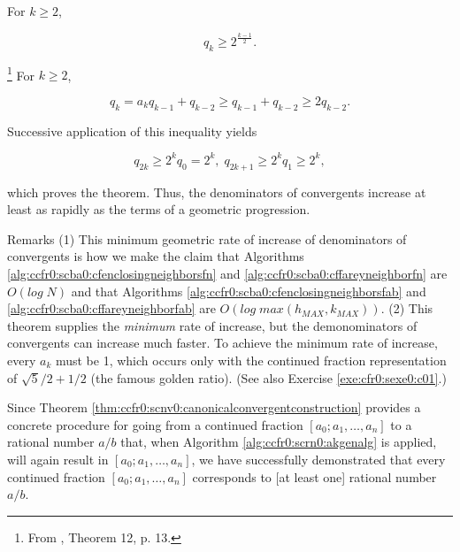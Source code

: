 \begin{vworktheoremstatement}
\label{thm:ccfr0:scnv0:minimumrateofconvergentdenominatorincrease}
For $k \geq 2$,

\begin{equation}
q_k \geq 2^{\frac{k-1}{2}} .
\end{equation}
\end{vworktheoremstatement}
\begin{vworktheoremproof}\hspace{-0.4em}\footnote{From
\cite{bibref:b:KhinchinClassic}, Theorem 12, p. 13.}
For $k \geq 2$,

\begin{equation}
q_k = a_k q_{k-1} + q_{k-2} \geq q_{k-1} + q_{k-2} \geq 2 q_{k-2} .
\end{equation}

Successive application of this inequality yields

\begin{equation}
q_{2k} \geq 2^k q_0 = 2^k, \; q_{2k+1} \geq 2^k q_1 \geq 2^k ,
\end{equation}

which proves the theorem.  Thus, the denominators of convergents
increase at least as rapidly as the terms of a geometric
progression.
\end{vworktheoremproof}
\begin{vworktheoremparsection}{Remarks}
(1) This minimum geometric rate of increase of denominators of convergents is how
we make the claim that Algorithms
\ref{alg:ccfr0:scba0:cfenclosingneighborsfn} and
\ref{alg:ccfr0:scba0:cffareyneighborfn} are $O(log \; N)$ and
that Algorithms 
\ref{alg:ccfr0:scba0:cfenclosingneighborsfab}
and \ref{alg:ccfr0:scba0:cffareyneighborfab} are
$O(log \; max(h_{MAX}, k_{MAX}))$.
(2) This theorem supplies the \emph{minimum} rate of increase,
but the demonominators of convergents can increase much faster.  To achieve
the minimum rate of increase, every $a_k$ must be 1, which occurs
only with the continued fraction representation of 
$\sqrt{5}/2 + 1/2$ (the famous golden ratio).
(See also Exercise \ref{exe:cfr0:sexe0:c01}.)
\end{vworktheoremparsection}
\vworktheoremfooter{}


Since Theorem \ref{thm:ccfr0:scnv0:canonicalconvergentconstruction}
provides a concrete
procedure for going from a continued fraction $[a_0; a_1, \ldots{} , a_n]$
to a rational number $a/b$ that, when Algorithm \ref{alg:ccfr0:scrn0:akgenalg}
is applied, will again result in $[a_0; a_1, \ldots{} , a_n]$, we have 
successfully demonstrated that every continued fraction 
$[a_0; a_1, \ldots{} , a_n]$ corresponds to [at least one]
rational number $a/b$.

